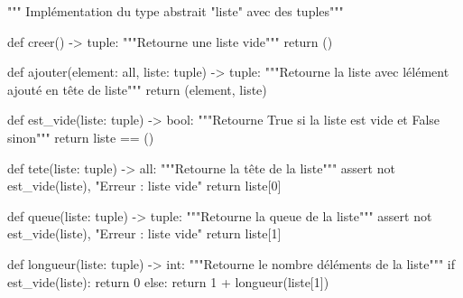 \documentclass[
  a4paper,
  DIV=11,
  numbers=noendperiod]{scrartcl}
\newenvironment{Shaded}{\begin{snugshade}}{\end{snugshade}}
\newcommand{\BuiltInTok}[1]{\textcolor[rgb]{0.00,0.23,0.31}{#1}}
\newcommand{\CommentTok}[1]{\textcolor[rgb]{0.37,0.37,0.37}{#1}}
\newcommand{\ControlFlowTok}[1]{\textcolor[rgb]{0.00,0.23,0.31}{#1}}
\newcommand{\DecValTok}[1]{\textcolor[rgb]{0.68,0.00,0.00}{#1}}
\newcommand{\KeywordTok}[1]{\textcolor[rgb]{0.00,0.23,0.31}{#1}}
\newcommand{\NormalTok}[1]{\textcolor[rgb]{0.00,0.23,0.31}{#1}}
\newcommand{\OperatorTok}[1]{\textcolor[rgb]{0.37,0.37,0.37}{#1}}
\newcommand{\StringTok}[1]{\textcolor[rgb]{0.13,0.47,0.30}{#1}}
\begin{document}
\begin{Shaded}
\begin{Highlighting}[]
\CommentTok{""" Implémentation du type abstrait "liste" avec des tuples"""}


\KeywordTok{def}\NormalTok{ creer() }\OperatorTok{{-}\textgreater{}} \BuiltInTok{tuple}\NormalTok{:}
    \CommentTok{"""Retourne une liste vide"""}
    \ControlFlowTok{return}\NormalTok{ ()}


\KeywordTok{def}\NormalTok{ ajouter(element: }\BuiltInTok{all}\NormalTok{, liste: }\BuiltInTok{tuple}\NormalTok{) }\OperatorTok{{-}\textgreater{}} \BuiltInTok{tuple}\NormalTok{:}
    \CommentTok{"""Retourne la liste avec l\textquotesingle{}élément ajouté en tête de liste"""}
    \ControlFlowTok{return}\NormalTok{ (element, liste)}


\KeywordTok{def}\NormalTok{ est\_vide(liste: }\BuiltInTok{tuple}\NormalTok{) }\OperatorTok{{-}\textgreater{}} \BuiltInTok{bool}\NormalTok{:}
    \CommentTok{"""Retourne True si la liste est vide et False sinon"""}
    \ControlFlowTok{return}\NormalTok{ liste }\OperatorTok{==}\NormalTok{ ()}


\KeywordTok{def}\NormalTok{ tete(liste: }\BuiltInTok{tuple}\NormalTok{) }\OperatorTok{{-}\textgreater{}} \BuiltInTok{all}\NormalTok{:}
    \CommentTok{"""Retourne la tête de la liste"""}
    \ControlFlowTok{assert} \KeywordTok{not}\NormalTok{ est\_vide(liste), }\StringTok{"Erreur : liste vide"}
    \ControlFlowTok{return}\NormalTok{ liste[}\DecValTok{0}\NormalTok{]}


\KeywordTok{def}\NormalTok{ queue(liste: }\BuiltInTok{tuple}\NormalTok{) }\OperatorTok{{-}\textgreater{}} \BuiltInTok{tuple}\NormalTok{:}
    \CommentTok{"""Retourne la queue de la liste"""}
    \ControlFlowTok{assert} \KeywordTok{not}\NormalTok{ est\_vide(liste), }\StringTok{"Erreur : liste vide"}
    \ControlFlowTok{return}\NormalTok{ liste[}\DecValTok{1}\NormalTok{]}


\KeywordTok{def}\NormalTok{ longueur(liste: }\BuiltInTok{tuple}\NormalTok{) }\OperatorTok{{-}\textgreater{}} \BuiltInTok{int}\NormalTok{:}
    \CommentTok{"""Retourne le nombre d\textquotesingle{}éléments de la liste"""}
    \ControlFlowTok{if}\NormalTok{ est\_vide(liste):}
        \ControlFlowTok{return} \DecValTok{0}
    \ControlFlowTok{else}\NormalTok{:}
        \ControlFlowTok{return} \DecValTok{1} \OperatorTok{+}\NormalTok{ longueur(liste[}\DecValTok{1}\NormalTok{])}
\end{Highlighting}
\end{Shaded}
\end{document}
